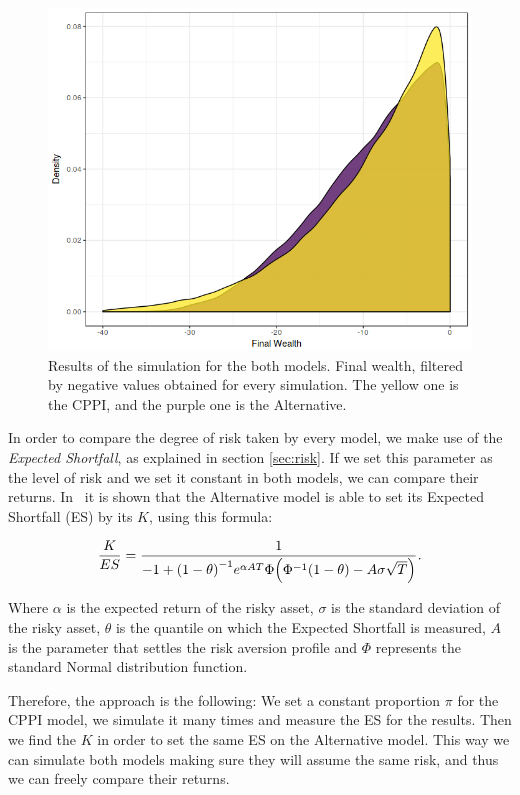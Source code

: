 \begin{figure}[h]
    \centering
    \includegraphics[scale=0.5]{./images/loss_both.png}
    \caption{Results of the simulation for the both models. Final wealth, filtered by negative values obtained for every simulation. The yellow one is the CPPI, and the purple one is the Alternative.}
    \label{fig:loss_both}
\end{figure}

In order to compare the degree of risk taken by every model, we make use of the \textit{Expected Shortfall}, as explained in section \ref{sec:risk}. If we set this parameter as the level of risk and we set it constant in both models, we can compare their returns. In~\cite{a:guillen-optimisation} it is shown that the Alternative model is able to set its Expected Shortfall (ES) by its $K$, using this formula:

\begin{align}\label{eq:kes}
	\frac{K}{ES} = \frac{1}{-1 + \qty(1 - \theta)^{-1} e^{\alpha A T}\Phi\qty(\Phi^{-1}\qty(1 - \theta) - A\sigma\sqrt{T})} \emph{.}
\end{align}

Where $\alpha$ is the expected return of the risky asset, $\sigma$ is the standard deviation of the risky asset, $\theta$ is the quantile on which the Expected Shortfall is measured, $A$ is the parameter that settles the risk aversion profile and $\Phi$ represents the standard Normal distribution function.

Therefore, the approach is the following: We set a constant proportion $\pi$ for the CPPI model, we simulate it many times and measure the ES for the results. Then we find the $K$ in order to set the same ES on the Alternative model. This way we can simulate both models making sure they will assume the same risk, and thus we can freely compare their returns.

